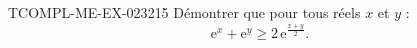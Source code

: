 \begin{exercice}{TCOMPL-ME-EX-023}{2}{15}
Démontrer que pour tous réels $x$ et $y$ :
\[ \mathrm{e}^x + \mathrm{e}^y \geq 2\,\mathrm{e}^{\frac{x+y}{2}}. \]

\end{exercice}
